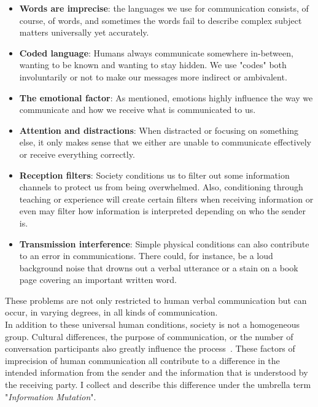 \begin{itemize}
	\item \textbf{Words are imprecise}: the languages we use for communication consists, of course, of words, and sometimes the words fail to describe complex subject matters universally yet accurately.
	\item \textbf{Coded language}: Humans always communicate somewhere in-between, wanting to be known and wanting to stay hidden. We use "codes" both involuntarily or not to make our messages more indirect or ambivalent.
	\item \textbf{The emotional factor}: As mentioned, emotions highly influence the way we communicate and how we receive what is communicated to us.
	\item \textbf{Attention and distractions}: When distracted or focusing on something else, it only makes sense that we either are unable to communicate effectively or receive everything correctly.
	\item \textbf{Reception filters}: Society conditions us to filter out some information channels to protect us from being overwhelmed. Also, conditioning through teaching or experience will create certain filters when receiving information or even may filter how information is interpreted depending on who the sender is.
	\item \textbf{Transmission interference}: Simple physical conditions can also contribute to an error in communications. There could, for instance, be a loud background noise that drowns out a verbal utterance or a stain on a book page covering an important written word.
\end{itemize}
These problems are not only restricted to human verbal communication but can occur, in varying degrees, in all kinds of communication.~\cite{Munsaka2014}\\
In addition to these universal human conditions, society is not a homogeneous group. Cultural differences, the purpose of communication, or the number of conversation participants also greatly influence the process~\cite{Chapanis1975}. These factors of imprecision of human communication all contribute to a difference in the intended information from the sender and the information that is understood by the receiving party. I collect and describe this difference under the umbrella term "\textit{Information Mutation}".
